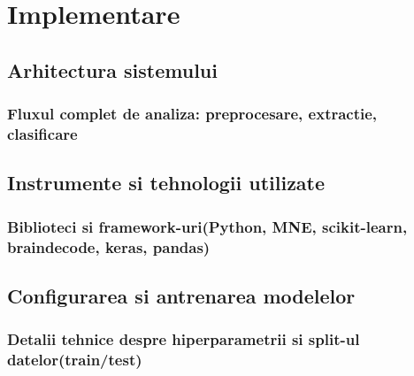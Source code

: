 \chapter{Implementare}

\section{Arhitectura sistemului}
\subsection{Fluxul complet de analiza: preprocesare, extractie, clasificare}

\section{Instrumente si tehnologii utilizate}
\subsection{Biblioteci si framework-uri(Python, MNE, scikit-learn, braindecode, keras, pandas)}

\section{Configurarea si antrenarea modelelor}
\subsection{Detalii tehnice despre hiperparametrii si split-ul datelor(train/test)}
